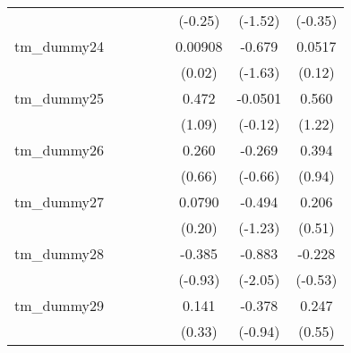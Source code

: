{\begin{tabular}{l*{7}{c}}
            &                     &                     &                     &                     &     (-0.25)         &     (-1.52)         &     (-0.35)         \\
[1em]
tm\_dummy24  &                     &                     &                     &                     &     0.00908         &      -0.679         &      0.0517         \\
            &                     &                     &                     &                     &      (0.02)         &     (-1.63)         &      (0.12)         \\
[1em]
tm\_dummy25  &                     &                     &                     &                     &       0.472         &     -0.0501         &       0.560         \\
            &                     &                     &                     &                     &      (1.09)         &     (-0.12)         &      (1.22)         \\
[1em]
tm\_dummy26  &                     &                     &                     &                     &       0.260         &      -0.269         &       0.394         \\
            &                     &                     &                     &                     &      (0.66)         &     (-0.66)         &      (0.94)         \\
[1em]
tm\_dummy27  &                     &                     &                     &                     &      0.0790         &      -0.494         &       0.206         \\
            &                     &                     &                     &                     &      (0.20)         &     (-1.23)         &      (0.51)         \\
[1em]
tm\_dummy28  &                     &                     &                     &                     &      -0.385         &      -0.883\sym{*}  &      -0.228         \\
            &                     &                     &                     &                     &     (-0.93)         &     (-2.05)         &     (-0.53)         \\
[1em]
tm\_dummy29  &                     &                     &                     &                     &       0.141         &      -0.378         &       0.247         \\
            &                     &                     &                     &                     &      (0.33)         &     (-0.94)         &      (0.55)         \\

\end{tabular}}
